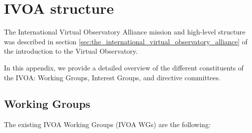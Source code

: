 \chapter{IVOA structure} %
\label{cha:the_ivoa}
	
	The International Virtual Observatory Alliance mission and
	high-level structure was described in section
	\ref{sec:the_international_virtual_observatory_alliance} of the
	introduction to the Virtual Observatory.
	
	In this appendix, we provide a detailed overview of the different
	constituents of the IVOA: Working Groups, Interest Groups, and 
	directive committees.
	
	\section{Working Groups} %
	\label{sec:working_groups}
		
		The existing IVOA Working
		Groups (IVOA WGs)
		are the following:
		
